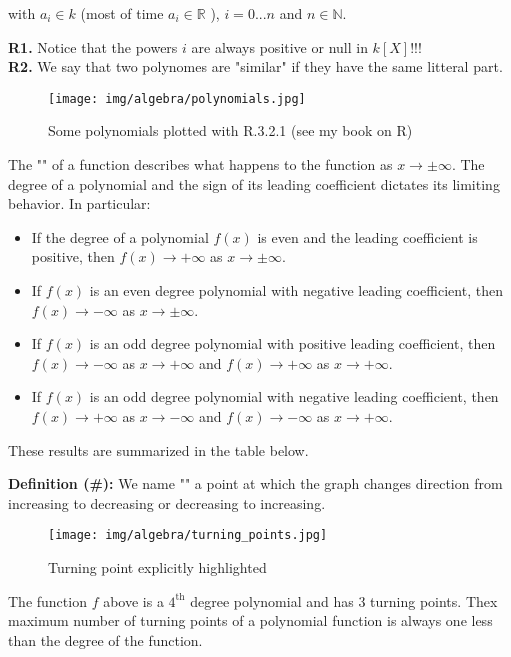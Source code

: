 	with $a_i\in k$ (most of time  $a_i\in \mathbb{R}$ ), $i=0...n$ and $n\in \mathbb{N}$.
	\begin{tcolorbox}[title=Remarks,colframe=black,arc=10pt]
	\textbf{R1.} Notice that the powers $i$ are always positive or null in $k[X]$!!!\\
	
	\textbf{R2.} We say that two polynomes are "similar" if they have the same litteral part.
	\end{tcolorbox}
	\begin{figure}[H]
		\centering
		\texttt{[image: img/algebra/polynomials.jpg]}
		\caption{Some polynomials plotted with R.3.2.1 (see my book on R)}
	\end{figure}
	The "" of a function describes what happens to the function as $x\rightarrow \pm\infty$. The degree of a polynomial and the sign of its leading coefficient dictates its limiting behavior. In particular:
	\begin{itemize}
		\item If the degree of a polynomial $f(x)$ is even and the leading coefficient is positive, then $f(x)\rightarrow +\infty$ as $x\rightarrow \pm\infty$.
		\item If $f(x)$ is an even degree polynomial with negative leading coefficient, then $f(x)\rightarrow -\infty$ as $x\rightarrow \pm\infty$. 
		\item If $f(x)$ is an odd degree polynomial with positive leading coefficient, then $f(x)\rightarrow -\infty$ as $x\rightarrow +\infty$ and $f(x)\rightarrow +\infty$ as $x\rightarrow +\infty$.
 
		\item If $f(x)$ is an odd degree polynomial with negative leading coefficient, then $f(x)\rightarrow +\infty$ as $x\rightarrow -\infty$ and $f(x)\rightarrow -\infty$ as $x\rightarrow +\infty$.
	\end{itemize}
	These results are summarized in the table below.
	
	
	\textbf{Definition (\#\mydef):} We name "" a point at which the graph changes direction from increasing to decreasing or decreasing to increasing.
	\begin{figure}[H]
		\centering
		\texttt{[image: img/algebra/turning\_points.jpg]}
		\caption{Turning point explicitly highlighted}
	\end{figure}
	The function $f$ above is a $4^{\text{th}}$ degree polynomial and has $3$ turning points. Thex maximum number of turning points of a polynomial function is always one less than the degree of the function.
	
